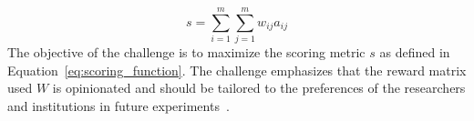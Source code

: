 \documentclass[\main/thesis.tex]{subfiles}
\begin{document}
\begin{equation}
    s = \sum_{i=1}^m\sum_{j=1}^m w_{ij}a_{ij} \label{eq:scoring_function}
\end{equation}
The objective of the challenge is to maximize the scoring metric $s$ as defined in Equation~\ref{eq:scoring_function}.
The challenge emphasizes that the reward matrix used $W$ is opinionated and should be tailored to the preferences of the researchers and institutions in future experiments~\cite{physionet_challenge_2020}.
\end{document}
